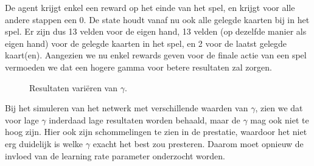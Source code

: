 \documentclass[11pt]{article}
\begin{document}
\noindent De agent krijgt enkel een reward op het einde van het spel, en krijgt voor alle andere stappen een 0. De state houdt vanaf nu ook alle gelegde kaarten bij in het spel. Er zijn dus 13 velden voor de eigen hand, 13 velden (op dezelfde manier als eigen hand) voor de gelegde kaarten in het spel, en 2 voor de laatst gelegde kaart(en). Aangezien we nu enkel rewards geven voor de finale actie van een spel vermoeden we dat een hogere gamma voor betere resultaten zal zorgen.
\begin{figure}[H]
    \centering
    \qquad
    \caption{Resultaten variëren van $\gamma$.}
\end{figure}
\noindent Bij het simuleren van het netwerk met verschillende waarden van $\gamma$, zien we dat voor lage $\gamma$ inderdaad lage resultaten worden behaald, maar de $\gamma$ mag ook niet te hoog zijn. Hier ook zijn schommelingen te zien in de prestatie, waardoor het niet erg duidelijk is welke $\gamma$ exacht het best zou presteren. Daarom moet opnieuw de invloed van de learning rate parameter onderzocht worden. 
\end{document}
